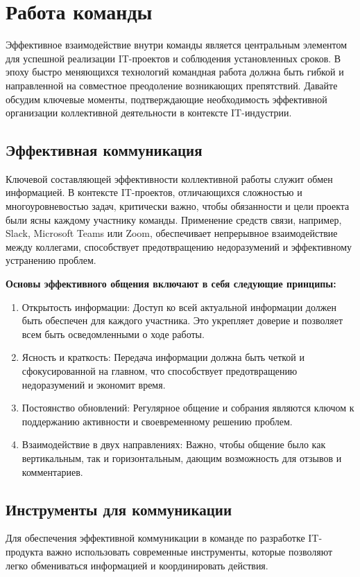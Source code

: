 \chapter{Работа команды}
\label{ch:team_work}
    
    Эффективное взаимодействие внутри команды является центральным элементом для успешной реализации IT-проектов и соблюдения установленных сроков. В эпоху быстро меняющихся технологий командная работа должна быть гибкой и направленной на совместное преодоление возникающих препятствий. Давайте обсудим ключевые моменты, подтверждающие необходимость эффективной организации коллективной деятельности в контексте IT-индустрии.

    \section{Эффективная коммуникация}
    Ключевой составляющей эффективности коллективной работы служит обмен информацией. В контексте IT-проектов, отличающихся сложностью и многоуровневостью задач, критически важно, чтобы обязанности и цели проекта были ясны каждому участнику команды. Применение средств связи, например, Slack, Microsoft Teams или Zoom, обеспечивает непрерывное взаимодействие между коллегами, способствует предотвращению недоразумений и эффективному устранению проблем.

    \textbf{Основы эффективного общения включают в себя следующие принципы:} \\
    \begin{enumerate}
        \item Открытость информации: Доступ ко всей актуальной информации должен быть обеспечен для каждого участника. Это укрепляет доверие и позволяет всем быть осведомленными о ходе работы.
        \item Ясность и краткость: Передача информации должна быть четкой и сфокусированной на главном, что способствует предотвращению недоразумений и экономит время.
        \item Постоянство обновлений: Регулярное общение и собрания являются ключом к поддержанию активности и своевременному решению проблем.
        \item Взаимодействие в двух направлениях: Важно, чтобы общение было как вертикальным, так и горизонтальным, дающим возможность для отзывов и комментариев.
    \end{enumerate}

    \section{Инструменты для коммуникации}
    Для обеспечения эффективной коммуникации в команде по разработке IT-продукта важно использовать современные инструменты, которые позволяют легко обмениваться информацией и координировать действия.

